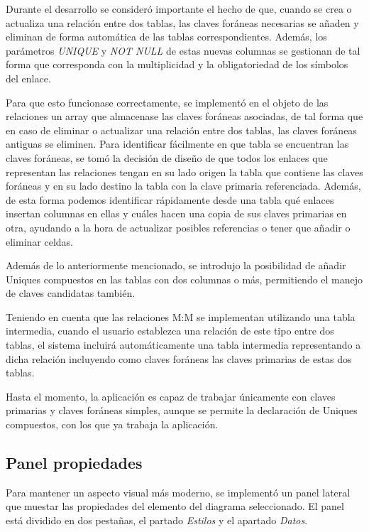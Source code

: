 Durante el desarrollo se consideró importante el hecho de que, cuando se crea o actualiza una relación entre dos tablas, las claves foráneas necesarias se añaden y eliminan de forma automática de las tablas correspondientes. Además, los parámetros \textit{UNIQUE} y \textit{NOT NULL} de estas nuevas columnas se gestionan de tal forma que corresponda con la multiplicidad y la obligatoriedad de los símbolos del enlace.

Para que esto funcionase correctamente, se implementó en el objeto de las relaciones un array que almacenase las claves foráneas asociadas, de tal forma que en caso de eliminar o actualizar una relación entre dos tablas, las claves foráneas antiguas se eliminen. Para identificar fácilmente en que tabla se encuentran las claves foráneas, se tomó la decisión de diseño de que todos los enlaces que representan las relaciones tengan en su lado origen la tabla que contiene las claves foráneas y en su lado destino la tabla con la clave primaria referenciada. Además, de esta forma podemos identificar rápidamente desde una tabla qué enlaces insertan columnas en ellas y cuáles hacen una copia de sus claves primarias en otra, ayudando a la hora de actualizar posibles referencias o tener que añadir o eliminar celdas.

Además de lo anteriormente mencionado, se introdujo la posibilidad de añadir Uniques compuestos en las tablas con dos columnas o más, permitiendo el manejo de claves candidatas también.

Teniendo en cuenta que las relaciones M:M se implementan utilizando una tabla intermedia, cuando el usuario establezca una relación de este tipo entre dos tablas, el sistema incluirá automáticamente una tabla intermedia representando a dicha relación incluyendo como claves foráneas las claves primarias de estas dos tablas.

Hasta el momento, la aplicación es capaz de trabajar únicamente con claves primarias y claves foráneas simples, aunque se permite la declaración de Uniques compuestos, con los que ya trabaja la aplicación.

\subsection{Panel propiedades}

Para mantener un aspecto visual más moderno, se implementó un panel lateral que muestar las propiedades del elemento del diagrama seleccionado. El panel está dividido en dos pestañas, el partado \textit{Estilos} y el apartado \textit{Datos}.

